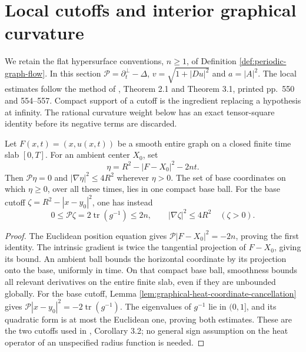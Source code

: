 \chapter{Local cutoffs and interior graphical curvature}\label{sec:graphical-local-cutoffs}
We retain the flat hypersurface conventions, $n\geq1$, of Definition \ref{def:periodic-graph-flow}. In this section $\mathcal P=\partial_t^\perp-\Delta$, $v=\sqrt{1+|Du|^2}$ and $a=|A|^2$. The local estimates follow the method of \cite{EH91}, Theorem 2.1 and Theorem 3.1, printed pp.~550 and 554--557. Compact support of a cutoff is the ingredient replacing a hypothesis at infinity. The rational curvature weight below has an exact tensor-square identity before its negative terms are discarded.

\begin{lemma}\label{lem:graphical-compact-cutoff-geometry}
Let $F(x,t)=(x,u(x,t))$ be a smooth entire graph on a closed finite time slab $[0,T]$. For an ambient center $X_0$, set
\[
 \eta=R^2-|F-X_0|^2-2nt.
\]
Then $\mathcal P\eta=0$ and $|\nabla\eta|^2\leq4R^2$ wherever $\eta>0$. The set of base coordinates on which $\eta\geq0$, over all these times, lies in one compact base ball. For the base cutoff $\zeta=R^2-|x-y_0|^2$, one has instead
\[
 0\leq\mathcal P\zeta=2\operatorname{tr}(g^{-1})\leq2n,
 \qquad |\nabla\zeta|^2\leq4R^2\quad(\zeta>0).
\]
\end{lemma}
\begin{proof}
The Euclidean position equation gives $\mathcal P|F-X_0|^2=-2n$, proving the first identity. The intrinsic gradient is twice the tangential projection of $F-X_0$, giving its bound. An ambient ball bounds the horizontal coordinate by its projection onto the base, uniformly in time. On that compact base ball, smoothness bounds all relevant derivatives on the entire finite slab, even if they are unbounded globally. For the base cutoff, Lemma \ref{lem:graphical-heat-coordinate-cancellation} gives $\mathcal P|x-y_0|^2=-2\operatorname{tr}(g^{-1})$. The eigenvalues of $g^{-1}$ lie in $(0,1]$, and its quadratic form is at most the Euclidean one, proving both estimates. These are the two cutoffs used in \cite{EH91}, Corollary 3.2; no general sign assumption on the heat operator of an unspecified radius function is needed.
\end{proof}

